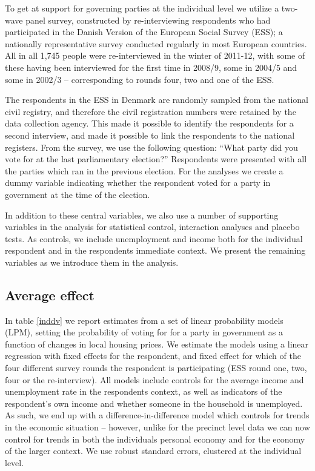 \documentclass[12pt,a4paper]{article}
\begin{document}
To get at support for governing parties at the individual level we utilize a two-wave panel survey, constructed by re-interviewing respondents who had participated in the Danish Version of the European Social Survey (ESS);  a nationally representative survey conducted regularly in most European countries. All in all 1,745 people were re-interviewed in the winter of 2011-12, with some of these having been interviewed for the first time in 2008/9, some in 2004/5 and some in 2002/3 -- corresponding to rounds four, two and one of the ESS. 

The respondents in the ESS in Denmark are randomly sampled from the national civil registry, and therefore the civil registration numbers were retained by the data collection agency. This made it possible to identify the respondents for a second interview, and made it possible to link the respondents to the national registers. From the survey, we use the following question: ``What party did you vote for at the last parliamentary election?'' Respondents were presented with all the parties which ran in the previous election. For the analyses we create a dummy variable indicating whether the respondent voted for a party in government at the time of the election. 

In addition to these central variables, we also use a number of supporting variables in the analysis for statistical control, interaction analyses and placebo tests. As controls, we include unemployment and income both for the individual respondent and in the respondents immediate context. We present the remaining variables as we introduce them in the analysis.

\subsection{Average effect}
In table \ref{inddv}  we report estimates from a set of linear probability models (LPM), setting the probability of voting for for a party in government as a function of changes in local housing prices. We estimate the models using a linear regression with fixed effects for the respondent, and fixed effect for which of the four different survey rounds the respondent is participating  (ESS round one, two, four or the re-interview). All models include controls for the average income and unemployment rate in the respondents context, as well as indicators of the respondent's own income and whether someone in the household is unemployed. As such, we end up with a difference-in-difference model which controls for trends in the economic situation -- however, unlike for the precinct level data we can now control for trends in both the individuals personal economy and for the economy of the larger context. We use robust standard errors, clustered at the individual level.
\end{document}
